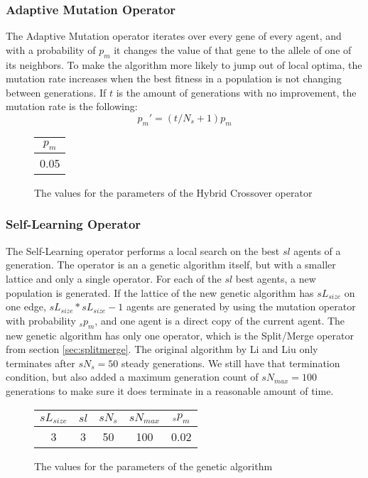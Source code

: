 \subsubsection{Adaptive Mutation Operator}
The Adaptive Mutation operator iterates over every gene of every agent, and with a probability of $p_m$ it changes the value of that gene to the allele of one of its neighbors. To make the algorithm more likely to jump out of local optima, the mutation rate increases when the best fitness in a population is not changing between generations. If $t$ is the amount of generations with no improvement, the mutation rate is the following:
\begin{equation}
p_{m}' = ( t / N_s + 1)p_m
\end{equation}

\begin{figure}[H]
\begin{center}
\begin{tabular}{ c }
 $p_{m}$\\
 \hline  
  0.05
\end{tabular}
\caption{The values for the parameters of the Hybrid Crossover operator}
\end{center}
\end{figure}  
\subsubsection{Self-Learning Operator}
The Self-Learning operator performs a local search on the best $sl$ agents of a generation. The operator is an a genetic algorithm itself, but with a smaller lattice and only a single operator. For each of the $sl$ best agents, a new population is generated. If the lattice of the new genetic algorithm has $sL_{size}$ on one edge, $sL_{size} * sL_{size} - 1$ agents are generated by using the mutation operator with probability $_{s}p_{m}$, and one agent is a direct copy of the current agent. The new genetic algorithm has only one operator, which is the Split/Merge operator from section \ref{sec:splitmerge}. The original algorithm by Li and Liu only terminates after $sN_s = 50$ steady generations. We still have that termination condition, but also added a maximum generation count of $sN_{max} = 100$ generations to make sure it does terminate in a reasonable amount of time.
\par
\begin{figure}[H]
\begin{center}
\begin{tabular}{ c c c c c}
 $sL_{size}$ & $sl$ &  $sN_{s}$ & $sN_{max}$ & $_{s}p_{m}$ \\
 \hline  
  3 & 3 &  50 & 100 & 0.02
\end{tabular}
\caption{The values for the parameters of the genetic algorithm}
\end{center}
\end{figure}  

